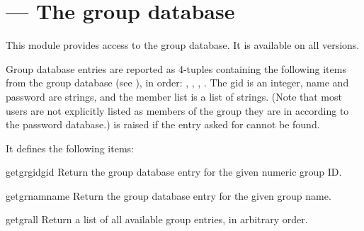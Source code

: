 \section{ ---
         The group database}



This module provides access to the \UNIX{} group database.
It is available on all \UNIX{} versions.

Group database entries are reported as 4-tuples containing the
following items from the group database (see ), in order:
,
,
,
.
The gid is an integer, name and password are strings, and the member
list is a list of strings.
(Note that most users are not explicitly listed as members of the
group they are in according to the password database.)
 is raised if the entry asked for cannot be found.

It defines the following items:

\begin{funcdesc}{getgrgid}{gid}
Return the group database entry for the given numeric group ID.
\end{funcdesc}

\begin{funcdesc}{getgrnam}{name}
Return the group database entry for the given group name.
\end{funcdesc}

\begin{funcdesc}{getgrall}{}
Return a list of all available group entries, in arbitrary order.
\end{funcdesc}
